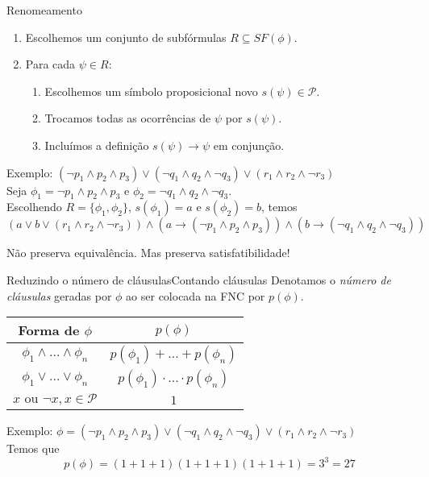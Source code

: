 \begin{frame}{Renomeamento}
	\begin{enumerate}
		\item Escolhemos um conjunto de subfórmulas $R \subseteq SF(\phi)$.
		\pause\item Para cada $\psi \in R$:
		\begin{enumerate}
			\pause\item Escolhemos um símbolo proposicional novo $s(\psi) \in \mathcal{P}$.
			\pause\item Trocamos todas as ocorrências de $\psi$ por $s(\psi)$.
			\pause\item Incluímos a definição $s(\psi) \rightarrow \psi$ em conjunção.
		\end{enumerate}
	\end{enumerate}
	
	\begin{small}
	\pause Exemplo: $(\neg p_1 \wedge p_2 \wedge p_3) \vee (\neg q_1 \wedge q_2 \wedge \neg q_3) \vee (r_1 \wedge r_2 \wedge \neg r_3)$\\
	\pause Seja $\phi_1 = \neg p_1 \wedge p_2 \wedge p_3$ e $\phi_2 = \neg q_1 \wedge q_2 \wedge \neg q_3$.\\
	\pause Escolhendo $R = \{\phi_1,\phi_2 \}$, $s(\phi_1) = a$ e $s(\phi_2) = b$, temos\pause $$(a \vee b \vee (r_1 \wedge r_2 \wedge \neg r_3)) \wedge (a \rightarrow (\neg p_1 \wedge p_2 \wedge p_3)) \wedge (b \rightarrow (\neg q_1 \wedge q_2 \wedge \neg q_3))$$
	
	\pause Não preserva equivalência. \pause Mas preserva satisfatibilidade!
	\end{small}
\end{frame}

\begin{frame}{Reduzindo o número de cláusulas}{Contando cláusulas}
	Denotamos o \emph{número de cláusulas} geradas por $\phi$ ao ser colocada na FNC por $p(\phi)$.
	\pause
	\begin{center}
	\begin{tabular}{c|c}
		Forma de $\phi$                   & $p(\phi)$                                 \\ \hline
		$\phi_1 \wedge ... \wedge \phi_n$ & $p(\phi_1) + ... + p(\phi_n)$                                  \\
		$\phi_1 \vee ... \vee \phi_n$     & $p(\phi_1) \cdot ... \cdot p(\phi_n)$                       \\
		$x \text{ ou } \neg x, x \in \mathcal{P}$            & $1$                                                             \\
	\end{tabular}
	\end{center}
	
	\pause Exemplo: $\phi = (\neg p_1 \wedge p_2 \wedge p_3) \vee (\neg q_1 \wedge q_2 \wedge \neg q_3) \vee (r_1 \wedge r_2 \wedge \neg r_3)$\\
	\pause Temos que $$p(\phi) = (1 + 1 + 1)(1 + 1 + 1)(1 + 1 + 1) = 3^3 = 27$$
\end{frame}

